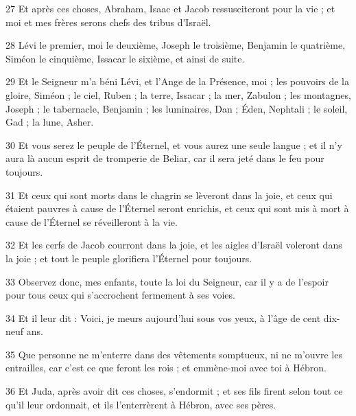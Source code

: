 \par 27 Et après ces choses, Abraham, Isaac et Jacob ressusciteront pour la vie ; et moi et mes frères serons chefs des tribus d'Israël.

\par 28 Lévi le premier, moi le deuxième, Joseph le troisième, Benjamin le quatrième, Siméon le cinquième, Issacar le sixième, et ainsi de suite.

\par 29 Et le Seigneur m'a béni Lévi, et l'Ange de la Présence, moi ; les pouvoirs de la gloire, Siméon ; le ciel, Ruben ; la terre, Issacar ; la mer, Zabulon ; les montagnes, Joseph ; le tabernacle, Benjamin ; les luminaires, Dan ; Éden, Nephtali ; le soleil, Gad ; la lune, Asher.

\par 30 Et vous serez le peuple de l'Éternel, et vous aurez une seule langue ; et il n'y aura là aucun esprit de tromperie de Beliar, car il sera jeté dans le feu pour toujours.

\par 31 Et ceux qui sont morts dans le chagrin se lèveront dans la joie, et ceux qui étaient pauvres à cause de l'Éternel seront enrichis, et ceux qui sont mis à mort à cause de l'Éternel se réveilleront à la vie.

\par 32 Et les cerfs de Jacob courront dans la joie, et les aigles d'Israël voleront dans la joie ; et tout le peuple glorifiera l'Éternel pour toujours.

\par 33 Observez donc, mes enfants, toute la loi du Seigneur, car il y a de l'espoir pour tous ceux qui s'accrochent fermement à ses voies.

\par 34 Et il leur dit : Voici, je meurs aujourd'hui sous vos yeux, à l'âge de cent dix-neuf ans.

\par 35 Que personne ne m'enterre dans des vêtements somptueux, ni ne m'ouvre les entrailles, car c'est ce que feront les rois ; et emmène-moi avec toi à Hébron.

\par 36 Et Juda, après avoir dit ces choses, s'endormit ; et ses fils firent selon tout ce qu'il leur ordonnait, et ils l'enterrèrent à Hébron, avec ses pères.


